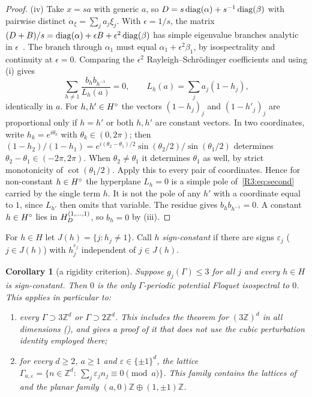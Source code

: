 \documentclass[11pt]{amsart}
\newtheorem{corollary}[theorem]{Corollary}
\theoremstyle{definition}
\theoremstyle{remark}
\providecommand{\Z}{\mathbb Z}
\begin{document}
\begin{proof}
(iv) Take $x=sa$ with generic $a$, so $D=s\operatorname{diag}(\alpha)+s^{-1}\operatorname{diag}(\beta)$ with
pairwise distinct $\alpha_\xi=\sum_ja_j\xi_j$. With $\epsilon=1/s$, the matrix
$(D+B)/s=\operatorname{diag}(\alpha)+\epsilon B+\epsilon^2\operatorname{diag}(\beta)$ has simple eigenvalue
branches analytic in $\epsilon$~\cite{R3-Kato}. The branch through $\alpha_1$ must
equal $\alpha_1+\epsilon^2\beta_1$, by isospectrality and continuity at
$\epsilon=0$. Comparing the $\epsilon^2$ Rayleigh--Schr\"odinger coefficients and
using (i) gives
\begin{equation}\label{R3:eq:second}
 \sum_{h\ne1}\frac{b_hb_{h^{-1}}}{L_h(a)}=0,\qquad L_h(a)=\sum_ja_j(1-h_j),
\end{equation}
identically in $a$. For $h,h'\in H^{\circ}$ the vectors $(1-h_j)_j$ and $(1-h'_j)_j$
are proportional only if $h=h'$ or both $h,h'$ are constant vectors. In two
coordinates, write $h_k=e^{i\theta_k}$ with $\theta_k\in(0,2\pi)$; then
$(1-h_2)/(1-h_1)=e^{i(\theta_2-\theta_1)/2}\sin(\theta_2/2)/\sin(\theta_1/2)$
determines $\theta_2-\theta_1\in(-2\pi,2\pi)$. When $\theta_2\ne\theta_1$ it
determines $\theta_1$ as well, by strict monotonicity of $\cot(\theta_1/2)$.
Apply this to every pair of coordinates. Hence for non-constant $h\in H^{\circ}$ the
hyperplane $L_h=0$ is a simple pole of~\eqref{R3:eq:second} carried by the single
term $h$. It is not the pole of any $h'$ with a coordinate equal to $1$, since
$L_{h'}$ then omits that variable. The residue gives $b_hb_{h^{-1}}=0$. A
constant $h\in H^{\circ}$ lies in $H_{D}^{(1,\dots,1)}$, so $b_h=0$ by (iii).
\end{proof}

For $h\in H$ let $J(h)=\{j:h_j\neq1\}$. Call $h$ \emph{sign-constant} if there are
signs $\varepsilon_j$ ($j\in J(h)$) with $h_j^{\varepsilon_j}$ independent of
$j\in J(h)$.

\begin{corollary}[a rigidity criterion]\label{R3:cor:criterion}
Suppose $g_j(\Gamma)\le3$ for all $j$ and every $h\in H$ is sign-constant. Then $0$
is the only $\Gamma$-periodic potential Floquet isospectral to $0$. This applies
in particular to:
\begin{enumerate}
\item[(a)] every $\Gamma\supset3\Z^d$ or $\Gamma\supset2\Z^d$. This includes the theorem
for $(3\Z)^d$ in all dimensions (\cite[Part~XII]{K-034}), and gives a proof of it
that does not use the cubic perturbation identity employed there;
\item[(b)] for every $d\ge2$, $a\ge1$ and $\varepsilon\in\{\pm1\}^d$, the lattice
$\Gamma_{a,\varepsilon}=\{n\in\Z^d:\ \sum_j\varepsilon_jn_j\equiv0\pmod a\}$. This
family contains the lattices of~\cite[Theorem~6.1]{R3-FFORS} and the planar family
$(a,0)\Z\oplus(1,\pm1)\Z$.
\end{enumerate}
\end{corollary}
\end{document}
